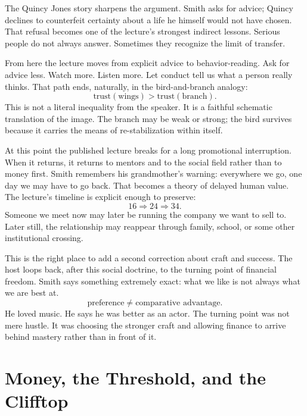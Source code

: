 The Quincy Jones story sharpens the argument. Smith asks for advice; Quincy declines to counterfeit certainty about a life he himself would not have chosen. That refusal becomes one of the lecture's strongest indirect lessons. Serious people do not always answer. Sometimes they recognize the limit of transfer.

From here the lecture moves from explicit advice to behavior-reading. Ask for advice less. Watch more. Listen more. Let conduct tell us what a person really thinks. That path ends, naturally, in the bird-and-branch analogy:
\begin{equation}
\text{trust}(\text{wings}) > \text{trust}(\text{branch}).
\end{equation}
This is not a literal inequality from the speaker. It is a faithful schematic translation of the image. The branch may be weak or strong; the bird survives because it carries the means of re-stabilization within itself.

At this point the published lecture breaks for a long promotional interruption. When it returns, it returns to mentors and to the social field rather than to money first. Smith remembers his grandmother's warning: everywhere we go, one day we may have to go back. That becomes a theory of delayed human value. The lecture's timeline is explicit enough to preserve:
\begin{equation}
16
\Longrightarrow
24
\Longrightarrow
34.
\end{equation}
Someone we meet now may later be running the company we want to sell to. Later still, the relationship may reappear through family, school, or some other institutional crossing.

This is the right place to add a second correction about craft and success. The host loops back, after this social doctrine, to the turning point of financial freedom. Smith says something extremely exact: what we like is not always what we are best at.
\begin{equation}
\text{preference} \neq \text{comparative advantage}.
\end{equation}
He loved music. He says he was better as an actor. The turning point was not mere hustle. It was choosing the stronger craft and allowing finance to arrive behind mastery rather than in front of it.

\section{Money, the Threshold, and the Clifftop}


